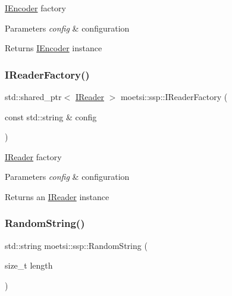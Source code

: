 \hyperlink{classmoetsi_1_1ssp_1_1IEncoder}{I\+Encoder} factory 
\begin{DoxyParams}{Parameters}
{\em config} & configuration \\
\hline
\end{DoxyParams}
\begin{DoxyReturn}{Returns}
\hyperlink{classmoetsi_1_1ssp_1_1IEncoder}{I\+Encoder} instance 
\end{DoxyReturn}
\mbox{\label{namespacemoetsi_1_1ssp_ad5e820c4c6a1a43d5e85608a06b86ea8}} 
\subsubsection{\texorpdfstring{I\+Reader\+Factory()}{IReaderFactory()}}
{\footnotesize\ttfamily std\+::shared\+\_\+ptr$<$ \hyperlink{classmoetsi_1_1ssp_1_1IReader}{I\+Reader} $>$ moetsi\+::ssp\+::\+I\+Reader\+Factory (\begin{DoxyParamCaption}\item[{const std\+::string \&}]{config }\end{DoxyParamCaption})}

\hyperlink{classmoetsi_1_1ssp_1_1IReader}{I\+Reader} factory 
\begin{DoxyParams}{Parameters}
{\em config} & configuration \\
\hline
\end{DoxyParams}
\begin{DoxyReturn}{Returns}
an \hyperlink{classmoetsi_1_1ssp_1_1IReader}{I\+Reader} instance 
\end{DoxyReturn}
\mbox{\label{namespacemoetsi_1_1ssp_ac615e71e018ead7a1598be1b67079f93}} 
\subsubsection{\texorpdfstring{Random\+String()}{RandomString()}}
{\footnotesize\ttfamily std\+::string moetsi\+::ssp\+::\+Random\+String (\begin{DoxyParamCaption}\item[{size\+\_\+t}]{length }\end{DoxyParamCaption})}

